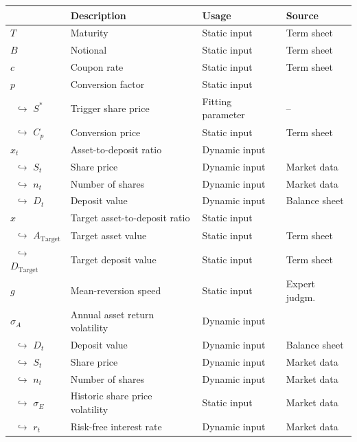 \begin{table}
	\setlength{\extrarowheight}{2.5pt}
	\centering
	\footnotesize
	\begin{tabular}{p{1.8cm}p{6.8cm}p{2.4cm}p{2.5cm}}
		\toprule
			 & \textbf{Description} & \textbf{Usage} & \textbf{Source} \\
		\midrule
			$T$ & Maturity & Static input & Term sheet\\
			$B$ & Notional & Static input & Term sheet \\
			$c$ & Coupon rate & Static input & Term sheet\\ 
			$p$ & Conversion factor & Static input & \\
			$\,\,\,$$\hookrightarrow$ $S^*$ & Trigger share price & Fitting parameter & --\\
			$\,\,\,$$\hookrightarrow$ $C_p$ & Conversion price & Static input & Term sheet\\
			$x_t$ & Asset-to-deposit ratio & Dynamic input & \\
			$\,\,\,$$\hookrightarrow$ $S_t$ & Share price & Dynamic input & Market data\\
			$\,\,\,$$\hookrightarrow$ $n_t$ & Number of shares & Dynamic input & Market data\\
			$\,\,\,$$\hookrightarrow$ $D_t$ & Deposit value & Dynamic input & Balance sheet\\
			$\hat{x}$ & Target asset-to-deposit ratio & Static input & \\
			$\,\,\,$$\hookrightarrow$ $A_\text{Target}$ & Target asset value & Static input & Term sheet \\
			$\,\,\,$$\hookrightarrow$ $D_\text{Target}$ & Target deposit value & Static input & Term sheet\\
			$g$ & Mean-reversion speed & Static input & Expert judgm.  \\
			$\sigma_A$ & Annual asset return volatility & Dynamic input & \\
			$\,\,\,$$\hookrightarrow$ $D_t$ & Deposit value & Dynamic input & Balance sheet\\
			$\,\,\,$$\hookrightarrow$ $S_t$ & Share price & Dynamic input & Market data\\
			$\,\,\,$$\hookrightarrow$ $n_t$ & Number of shares & Dynamic input & Market data\\
			$\,\,\,$$\hookrightarrow$ $\sigma_E$& Historic share price volatility & Static input & Market data\\
			$\,\,\,$$\hookrightarrow$ $r_t$ & Risk-free interest rate & Dynamic input & Market data \\

\end{tabular}
\end{table}
